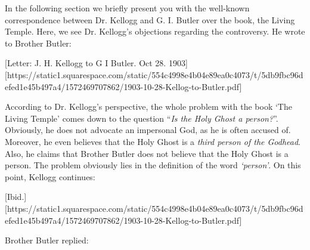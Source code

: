 In the following section we briefly present you with the well-known correspondence between Dr. Kellogg and G. I. Butler over the book, the Living Temple. Here, we see Dr. Kellogg’s objections regarding the controversy. He wrote to Brother Butler:

[Letter: J. H. Kellogg to G I Butler. Oct 28. 1903][https://static1.squarespace.com/static/554c4998e4b04e89ea0c4073/t/5db9fbc96defed1e45b497a4/1572469707862/1903-10-28-Kellog-to-Butler.pdf]

According to Dr. Kellogg’s perspective, the whole problem with the book ‘The Living Temple’ comes down to the question “\textit{Is the Holy Ghost a person?}”. Obviously, he does not advocate an impersonal God, as he is often accused of. Moreover, he even believes that the Holy Ghost is a \textit{third person of the Godhead}. Also, he claims that Brother Butler does not believe that the Holy Ghost is a person. The problem obviously lies in the definition of the word \textit{‘person’}. On this point, Kellogg continues:

[Ibid.][https://static1.squarespace.com/static/554c4998e4b04e89ea0c4073/t/5db9fbc96defed1e45b497a4/1572469707862/1903-10-28-Kellog-to-Butler.pdf]

Brother Butler replied:


